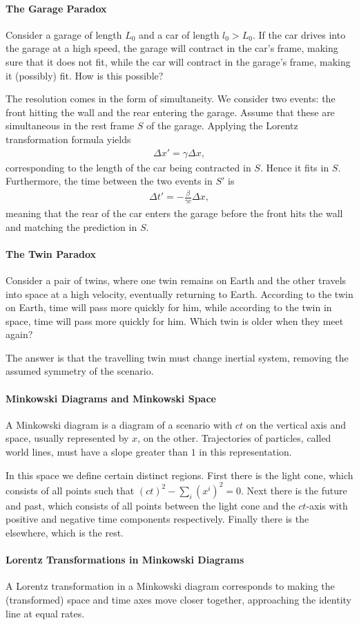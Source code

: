\paragraph{The Garage Paradox}
Consider a garage of length $L_{0}$ and a car of length $l_{0} > L_{0}$. If the car drives into the garage at a high speed, the garage will contract in the car's frame, making sure that it does not fit, while the car will contract in the garage's frame, making it (possibly) fit. How is this possible?

The resolution comes in the form of simultaneity. We consider two events: the front hitting the wall and the rear entering the garage. Assume that these are simultaneous in the rest frame $S$ of the garage. Applying the Lorentz transformation formula yields
\begin{align*}
	\Delta x' = \gamma\Delta x,
\end{align*}
corresponding to the length of the car being contracted in $S$. Hence it fits in $S$. Furthermore, the time between the two events in $S'$ is
\begin{align*}
	\Delta t' = -\frac{\beta}{\gamma c}\Delta x,
\end{align*}
meaning that the rear of the car enters the garage before the front hits the wall and matching the prediction in $S$.

\paragraph{The Twin Paradox}
Consider a pair of twins, where one twin remains on Earth and the other travels into space at a high velocity, eventually returning to Earth. According to the twin on Earth, time will pass more quickly for him, while according to the twin in space, time will pass more quickly for him. Which twin is older when they meet again?

The answer is that the travelling twin must change inertial system, removing the assumed symmetry of the scenario.

\paragraph{Minkowski Diagrams and Minkowski Space}
A Minkowski diagram is a diagram of a scenario with $ct$ on the vertical axis and space, usually represented by $x$, on the other. Trajectories of particles, called world lines, must have a slope greater than $1$ in this representation.

In this space we define certain distinct regions. First there is the light cone, which consists of all points such that $(ct)^{2} - \sum\limits_{i}(x^{i})^{2} = 0$. Next there is the future and past, which consists of all points between the light cone and the $ct$-axis with positive and negative time components respectively. Finally there is the elsewhere, which is the rest.

\paragraph{Lorentz Transformations in Minkowski Diagrams}
A Lorentz transformation in a Minkowski diagram corresponds to making the (transformed) space and time axes move closer together, approaching the identity line at equal rates.